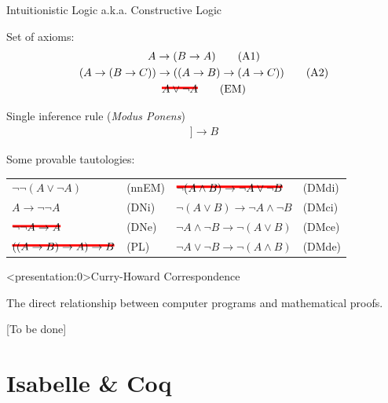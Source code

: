 \documentclass[aspectratio=169, 12pt, fleqn]{beamer}
\newcommand\hcancel[2][black]{\setbox0=\hbox{$#2$}%
\rlap{\raisebox{.45\ht0}{\textcolor{#1}{\rule{\wd0}{2pt}}}}#2}
\begin{document}
\begin{frame}{Intuitionistic Logic}
{a.k.a. Constructive Logic}

\vspace{10pt}
\textcolor{dkblue}{Set of axioms:}
\vspace{-10pt}
\begin{gather}
A \rightarrow (B \rightarrow A)
\tag{A1} \\
(A \rightarrow (B \rightarrow C)) \rightarrow ((A \rightarrow B) \rightarrow (A \rightarrow C))
\tag{A2} \\
\hcancel[red]{ A \lor \neg A }
\tag{EM} 
\end{gather}

\textcolor{dkblue}{Single inference rule (\textit{Modus Ponens})}
\vspace{-10pt}
\begin{gather} 
[\![ A, A \rightarrow B ]\!] \longrightarrow B
\tag{MP}
\end{gather}

\textcolor{dkblue}{Some provable tautologies:}
\begin{tabular}{p{.32\linewidth}p{.17\linewidth} p{.32\linewidth}p{.18\linewidth}}
  $\neg \neg (A \lor \neg A)$ & (nnEM) & $\hcancel[red]{ \neg (A \land B) \rightarrow \neg A \lor \neg B }$ & (DMdi) \\
  $A \rightarrow \neg \neg A$ & (DNi)  & $\neg (A \lor B) \rightarrow \neg A \land \neg B $ & (DMci) \\
  $\hcancel[red]{ \neg \neg A \rightarrow A }$ & (DNe)  & $\neg A \land \neg B \rightarrow  \neg (A \lor B) $ & (DMce) \\
  $\hcancel[red]{ ((A \rightarrow B) \rightarrow A) \rightarrow B }$ & (PL) & $\neg A \lor \neg B \rightarrow  \neg (A \land B) $ & (DMde)
\end{tabular}

\end{frame}

\begin{frame}<presentation:0>{Curry-Howard Correspondence}

The direct relationship between computer programs and mathematical proofs.

[To be done]
\end{frame}


\section{Isabelle \& Coq}%
\end{document}
